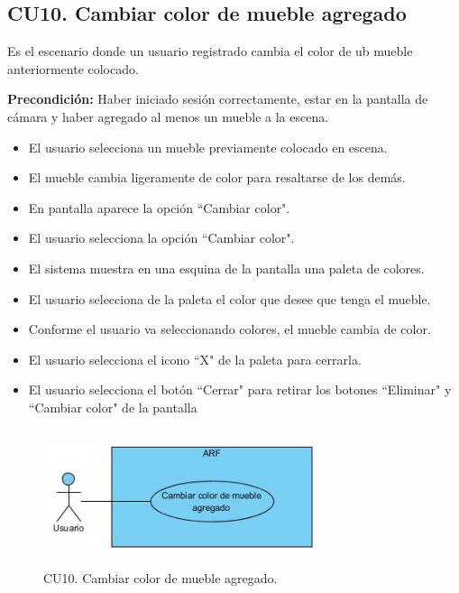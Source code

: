 \subsection{CU10. Cambiar color de mueble agregado}\par
Es el escenario donde un usuario registrado cambia el color de ub mueble anteriormente colocado.\par
\textbf{Precondición:} Haber iniciado sesión correctamente, estar en la pantalla de cámara y haber agregado al menos un mueble a la escena.\par
\begin{itemize}
	\item El usuario selecciona un mueble previamente colocado en escena.
	\item El mueble cambia ligeramente de color para resaltarse de los demás.
	\item En pantalla aparece la opción ``Cambiar color".
	\item El usuario selecciona la opción ``Cambiar color".
	\item El sistema muestra en una esquina de la pantalla una paleta de colores.
	\item El usuario selecciona de la paleta el color que desee que tenga el mueble.
	\item Conforme el usuario va seleccionando colores, el mueble cambia de color.
	\item El usuario selecciona el icono ``X" de la paleta para cerrarla.
	\item El usuario selecciona el botón ``Cerrar" para retirar los botones ``Eliminar" y ``Cambiar color" de la pantalla
\end{itemize}

\begin{figure}[h!]
	\centering
	\includegraphics[width=8cm,height=4cm]{imagenes/analisis/cu/cambiar_color.jpg}
	\caption{CU10. Cambiar color de mueble agregado.}
	\label{fig:cambiarcolor}
\end{figure} 

